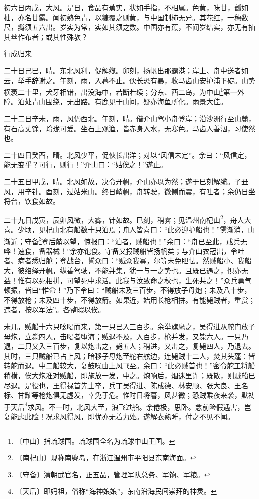 \documentclass[12pt,UTF-8,openany]{ctexbook}
\begin{document}
\begin{normalsize}
    初六日丙戌，大风。是日，食品有蕉实，状如手指，不相属。色黄，味甘，瓤如柚，亦名甘露。闻初熟色青，以糠覆之则黄，与中国制柿无异。其花红，一穗数尺，瓣须五六出。岁实为常，实如其须之数。中国亦有蕉，不闻岁结实，亦无有抽其丝作布者；或其性殊欤？
    
    行成归来
    
    二十日己巳，晴。东北风利，促解缆。卯刻，扬帆出那霸港；岸上、舟中送者如云，举手辞谢之。午刻，雨，入暮不止。伙长恐有暴，收马齿山安护浦下碇。山势横袤二十里，犬牙相错，出没海中，若断若续；分东、西二岛，为中山\footnote{〔中山〕指琉球国。琉球国全名为琉球中山王国。}第一外障。泊处青山围绕，无出路。有鹿见于山间，疑亦海鱼所化。雨景大佳。
    
    二十二日辛未，雨，风仍西北。午刻，晴。偕介山驾小舟登岸；沿沙洲行至山麓，有石高丈馀，玲珑可爱。坐石上观渔，皆赤身入水，无寒色。马齿人善泅，习使然也。
    
    二十四日癸酉，晴。北风少平，促伙长出洋；对以“风信未定”。余曰：“风信定，能无变乎？可行，则行！”介山曰：“姑俟之！”遂止。
    
    二十五日甲戌，晴。北风如故，决令开帆，介山亦以为然；遂于巳刻解缆。子丑风，用辛针。酉刻，过姑米山。终日峭帆，舟转驶，微侧而震，有吐者；余仍日坐将台，饮食如故。
    
    二十九日戊寅，辰卯风微，大雾，针如故。巳刻，稍霁；见温州南杞山\footnote{〔南杞山〕现称南麂岛，在浙江温州市平阳县东南海面。}，舟人大喜。少顷，见杞山北有船数十只泊焉；舟人皆喜曰：“此必迎护船也！”雾渐消，山渐近；守备\footnote{〔守备〕清朝武官名，正五品，管理军队总务、军饷、军粮。}登后艄以望，惊报曰：“泊者，贼船也！”余曰：“舟已至此，戒兵无哗！速食，备器械！”余亦饱食。守备又报贼船皆扬帆矣；与介山衣冠出，令吐者、病者悉归舱；登战台，誓众曰：“贼众我寡，尔等未免胆怯。然贼船小、我船大，彼络绎开帆，纵善驾驶，不能并集，犹一与一之势也。且既已遇之，惧亦无益！惟有以死相拼，可望死中求活。此我与汝致命之秋也，生死共之！”众兵勇气顿振，皆曰“惟命！”乃下令曰：“贼船未及三百步，不得放子母炮；未及八十步，不得放枪；未及四十步，不得放箭。如果近，始用长枪相拼。有能毙贼者，重赏；违者，按以军法”。各整暇以俟。
    
    未几，贼船十六只吆喝而来，第一只已入三百步。余举旗麾之，吴得进从舵门放子母炮，立毙四人，击喝者堕海；贼退不及，入百步，枪并发，又毙六人。一只乃退，二只又入三百步，复以炮击之，毙五人；稍进，又击之，复毙四人，乃退去。其时，三只贼船已占上风；暗移子母炮至舵右舷边，连毙贼十二人，焚其头蓬：皆转舵而退。中二船较大，复鼓噪由上风飞至。余曰：“此必贼首也！”密令舵工将船稍横，俟大炮准对贼船，即施放一发，中之。炮响后，烟迷里许；既散，则贼船巳尽退。是役也，王得禄首先士卒，兵丁吴得进、陈成德、林安顺、张大良、王名标、甘耀等枪炮俱无虚发，幸免于危。惟时日将暮，风甚微；恐贼乘夜来袭，默祷于天后\footnote{〔天后〕即妈祖，俗称“海神娘娘”，东南沿海民间崇拜的神灵。}求风。不一时，北风大至，浪飞过船。余倦极，思卧。念前险假遇害，岂复能虑此险！况求风得风，即忧亦无着力处。遂解衣熟睡，付之不见不闻。
    

\end{normalsize}
\end{document}
